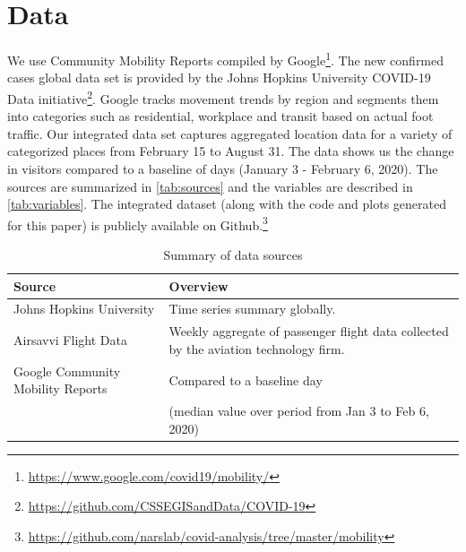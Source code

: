 \documentclass[titlepage,oneside,12pt]{article}
\newcommand{\trbcite}[1]{({\it \citenum{#1}})}
\newcommand{\?}{\stackrel{?}{=}}
\begin{document}



\section{Data}
We use Community Mobility Reports compiled by Google\footnote{\url{https://www.google.com/covid19/mobility/}}. %
The new confirmed cases global data set is provided by the Johns Hopkins University COVID-19 Data initiative\footnote{\url{https://github.com/CSSEGISandData/COVID-19}}.
Google tracks movement trends by region and segments them into categories such as residential, workplace and transit based on actual foot traffic. Our integrated data set captures aggregated location data for a variety of categorized places from February 15 to August 31. The data shows us the change in visitors compared to a baseline of days (January 3 - February 6, 2020).  
The sources are summarized in \autoref{tab:sources} and the variables are described in \autoref{tab:variables}.
The integrated dataset (along with the code and plots generated for this paper) is publicly available on Github.\footnote{\url{https://github.com/narslab/covid-analysis/tree/master/mobility}}


\begin{table}[h!]\small
  \centering
  \caption{Summary of data sources}
  \label{tab:sources}
\begin{tabular}{ll}\toprule
\bf Source                         & \bf Overview                                                                              \\\midrule
Johns Hopkins University          & Time series summary globally.                                                               \\
Airsavvi Flight Data                        & Weekly aggregate of passenger flight data collected by the aviation technology firm.                                          \\
  Google Community Mobility Reports & Compared to a baseline day \\
  & (median value over period from Jan 3 to Feb 6, 2020)\\\bottomrule
\end{tabular}
\end{table}
\end{document}
